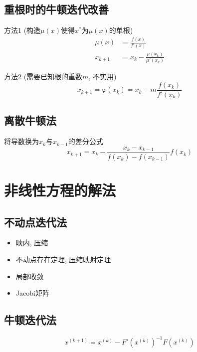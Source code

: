 \documentclass[twoside]{article}
\begin{document}
\subsection{重根时的牛顿迭代改善}
方法1 (构造$\mu(x)$使得$x^*$为$\mu(x)$的单根)
\begin{equation}
  \begin{aligned}
    \mu(x) &= \frac{f(x)}{f'(x)} \\
    x_{k+1} &= x_k - \frac{\mu(x_k)}{\mu'(x_k)}
  \end{aligned}
\end{equation}

方法2 (需要已知根的重数$m$, 不实用)
\begin{equation}
  x_{k+1} = \varphi(x_k) = x_k - m \frac{f(x_k)}{f'(x_k)}
\end{equation}

\subsection{离散牛顿法}
将导数换为$x_k$与$x_{k-1}$的差分公式
\begin{equation}
  x_{k+1} = x_k - \frac{x_k - x_{k-1}}{f(x_k) - f(x_{k-1})} f(x_k)
\end{equation}

\section{非线性方程的解法}\label{sec:fei_xian_xin_fang_chen_de_jie_fa_}
\subsection{不动点迭代法}
\begin{itemize}
  \item 映内, 压缩
  \item 不动点存在定理, 压缩映射定理
  \item 局部收敛
  \item Jacobi矩阵
\end{itemize}

\subsection{牛顿迭代法}
\begin{equation}
  x^{(k+1)} = x^{(k)} - F'(x^{(k)})^{-1} F(x^{(k)})
\end{equation}
\end{document}
